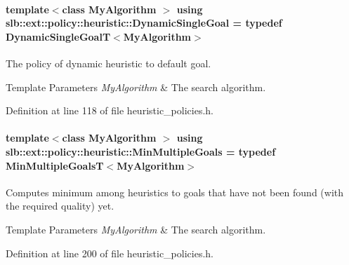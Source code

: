 \paragraph[{\texorpdfstring{Dynamic\+Single\+Goal}{DynamicSingleGoal}}]{\setlength{\rightskip}{0pt plus 5cm}template$<$class My\+Algorithm $>$ using {\bf slb\+::ext\+::policy\+::heuristic\+::\+Dynamic\+Single\+Goal} = typedef {\bf Dynamic\+Single\+GoalT}$<$My\+Algorithm$>$}\hypertarget{namespaceslb_1_1ext_1_1policy_1_1heuristic_abd4d8d1b33c56751ff726b83181b0609}{}\label{namespaceslb_1_1ext_1_1policy_1_1heuristic_abd4d8d1b33c56751ff726b83181b0609}


The policy of dynamic heuristic to default goal. 


\begin{DoxyTemplParams}{Template Parameters}
{\em My\+Algorithm} & The search algorithm. \\
\hline
\end{DoxyTemplParams}


Definition at line 118 of file heuristic\+\_\+policies.\+h.

\paragraph[{\texorpdfstring{Min\+Multiple\+Goals}{MinMultipleGoals}}]{\setlength{\rightskip}{0pt plus 5cm}template$<$class My\+Algorithm $>$ using {\bf slb\+::ext\+::policy\+::heuristic\+::\+Min\+Multiple\+Goals} = typedef {\bf Min\+Multiple\+GoalsT}$<$My\+Algorithm$>$}\hypertarget{namespaceslb_1_1ext_1_1policy_1_1heuristic_adb60983019024c0557fb57be8feab48c}{}\label{namespaceslb_1_1ext_1_1policy_1_1heuristic_adb60983019024c0557fb57be8feab48c}


Computes minimum among heuristics to goals that have not been found (with the required quality) yet. 


\begin{DoxyTemplParams}{Template Parameters}
{\em My\+Algorithm} & The search algorithm. \\
\hline
\end{DoxyTemplParams}


Definition at line 200 of file heuristic\+\_\+policies.\+h.

